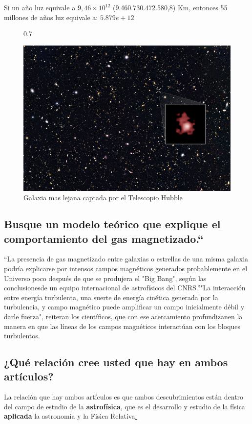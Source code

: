 \documentclass[11pt]{article}
\begin{document}
\begin{multicols}{2}
  Si un año luz equivale a $9,46×10^{12}$ (9.460.730.472.580,8) Km, entonces 55 millones de años luz equivale a: $5.879e+12$  \cite{luz}
  

\begin{figure}{0.7\linewidth}
  
  \centering
  \includegraphics[width=0.6\linewidth]{year.png}
  \caption{Galaxia mas lejana captada por el Telescopio Hubble}
  
\end{figure}

\subsection{Busque un modelo teórico que explique el comportamiento del gas magnetizado.“}

  “La presencia de gas magnetizado entre galaxias o estrellas de una misma galaxia podría explicarse por intensos campos magnéticos generados probablemente en el Universo poco después de que se produjera el "Big Bang", según las conclusionesde un equipo internacional de astrofísicos del CNRS.”"La interacción entre energía turbulenta, una suerte de energía cinética generada por la turbulencia, y campo magnético puede amplificar un campo inicialmente débil y darle fuerza", reiteran los científicos, que con ese acercamiento profundizanen la manera en que las líneas de los campos magnéticos interactúan con los bloques turbulentos.\cite{gases}

\subsection{¿Qué relación cree usted que hay en ambos artículos?}
  
  La relación que hay ambos artículos es que ambos descubrimientos están dentro del campo de estudio de la \textbf{astrofísica}\href{sec:1} , que es el desarrollo y estudio de la física \textbf{aplicada} la astronomía y la Fisica Relativa\href{sec:1}.
  

\end{multicols}
\end{document}
